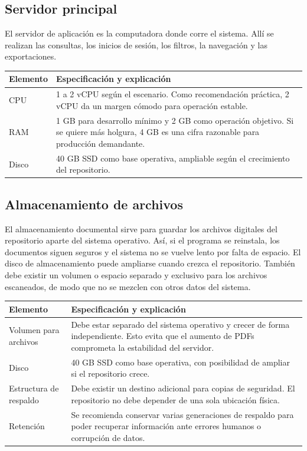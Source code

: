 \documentclass[12pt,a4paper]{report}
\begin{document}
\subsection*{Servidor principal}
El servidor de aplicación es la computadora donde corre el sistema. Allí se realizan las consultas, los inicios de sesión, los filtros, la navegación y las exportaciones.
\begin{longtable}{p{} p{}}
\toprule
\textbf{Elemento} & \textbf{Especificación y explicación} \\
\midrule
CPU & 1 a 2 vCPU según el escenario. Como recomendación práctica, 2 vCPU da un margen cómodo para operación estable. \\
RAM & 1 GB para desarrollo mínimo y 2 GB como operación objetivo. Si se quiere más holgura, 4 GB es una cifra razonable para producción demandante. \\
Disco & 40 GB SSD como base operativa, ampliable según el crecimiento del repositorio. \\
\bottomrule
\end{longtable}

\subsection*{Almacenamiento de archivos}
El almacenamiento documental sirve para guardar los archivos digitales del repositorio aparte del sistema operativo. Así, si el programa se reinstala, los documentos siguen seguros y el sistema no se vuelve lento por falta de espacio.
El disco de almacenamiento puede ampliarse cuando crezca el repositorio.
También debe existir un volumen o espacio separado y exclusivo para los archivos escaneados, de modo que no se mezclen con otros datos del sistema.
\begin{longtable}{p{} p{}}
\toprule
\textbf{Elemento} & \textbf{Especificación y explicación} \\
\midrule
Volumen para archivos & Debe estar separado del sistema operativo y crecer de forma independiente. Esto evita que el aumento de PDFs comprometa la estabilidad del servidor. \\
Disco & 40 GB SSD como base operativa, con posibilidad de ampliar si el repositorio crece. \\
Estructura de respaldo & Debe existir un destino adicional para copias de seguridad. El repositorio no debe depender de una sola ubicación física. \\
Retención & Se recomienda conservar varias generaciones de respaldo para poder recuperar información ante errores humanos o corrupción de datos. \\
\bottomrule
\end{longtable}
\end{document}
